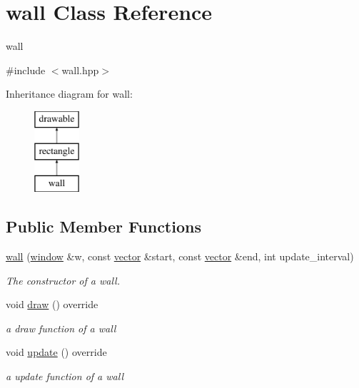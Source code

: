 \hypertarget{classwall}{}\section{wall Class Reference}
\label{classwall}


wall  




{\ttfamily \#include $<$wall.\+hpp$>$}

Inheritance diagram for wall\+:\begin{figure}[H]
\begin{center}
\leavevmode
\includegraphics[height=3.000000cm]{classwall}
\end{center}
\end{figure}
\subsection*{Public Member Functions}
\begin{DoxyCompactItemize}
\item 
\hyperlink{classwall_a6bbd0a74571562b849a2446ba29978dc}{wall} (\hyperlink{classwindow}{window} \&w, const \hyperlink{classvector}{vector} \&start, const \hyperlink{classvector}{vector} \&end, int update\+\_\+interval)
\begin{DoxyCompactList}\small\item\em The constructor of a wall. \end{DoxyCompactList}\item 
void \hyperlink{classwall_abbae6802729e5a2e2a83a61694747b33}{draw} () override
\begin{DoxyCompactList}\small\item\em a draw function of a wall \end{DoxyCompactList}\item 
void \hyperlink{classwall_a84c4981162efc4f914e064c30ad52f03}{update} () override
\begin{DoxyCompactList}\small\item\em a update function of a wall \end{DoxyCompactList}\end{DoxyCompactItemize}
